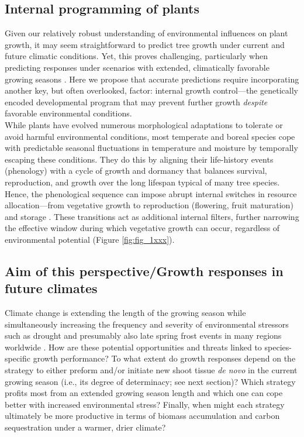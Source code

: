 \documentclass{article}
\begin{document}
		\subsection*{Internal programming of plants}
		Given our relatively robust understanding of environmental influences on plant growth, it may seem straightforward to predict tree growth under current and future climatic conditions. Yet, this proves challenging, particularly when predicting responses under scenarios with extended, climatically favorable growing seasons \citep{zohnerHowChangesSpring2021}. Here we propose that accurate predictions require incorporating another key, but often overlooked, factor: internal growth control---the genetically encoded developmental program that may prevent further growth \textit{despite} favorable environmental conditions.\\
		
		While plants have evolved numerous morphological adaptations to tolerate or avoid harmful environmental conditions, most temperate and boreal species cope with predictable seasonal fluctuations in temperature and moisture by temporally escaping these conditions. They do this by aligning their life-history events (phenology) with a cycle of growth and dormancy that balances survival, reproduction, and growth over the long lifespan typical of many tree species. Hence, the phenological sequence can impose abrupt internal switches in resource allocation---from vegetative growth to reproduction (flowering, fruit maturation) and storage \citep{stearnsTradeOffsLifeHistoryEvolution1989, chapinEcologyEconomicsStorage1990}. These transitions act as additional internal filters, further narrowing the effective window during which vegetative growth can occur, regardless of environmental potential (Figure \ref{fig:fig_1xxx}).\\
		
		\subsection*{Aim of this perspective/Growth responses in future climates}%
		Climate change is extending the length of the growing season while simultaneously increasing the frequency and severity of environmental stressors such as drought \citep{haoChangesSeverityCompound2018} and presumably also late spring frost events in many regions worldwide \citep{zohnerLatespringFrostRisk2020}. How are these potential opportunities and threats linked to species-specific growth performance? To what extent do growth responses depend on the strategy to either preform and/or initiate new shoot tissue \textit{de novo} in the current growing season (i.e., its degree of determinacy; see next section)? Which strategy profits most from an extended growing season length and which one can cope better with increased environmental stress? Finally, when might each strategy ultimately be more productive in terms of biomass accumulation and carbon sequestration under a warmer, drier climate?
		
\end{document}

